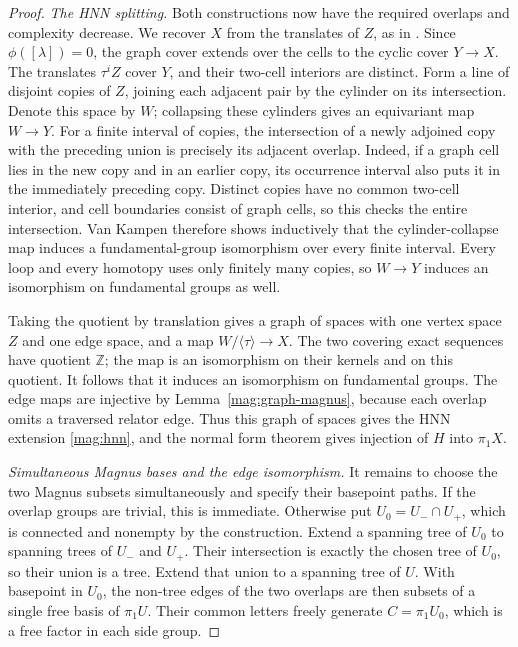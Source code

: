 \begin{proof}
\smallskip\noindent
\emph{The HNN splitting.}
Both constructions now have the required overlaps and complexity
decrease.  We recover $X$ from the translates of $Z$, as in
\cite[Proposition~4.3]{LintonHierarchies2025}.  Since
$\phi([\lambda])=0$, the graph cover extends over the cells to
the cyclic cover $Y\to X$.  The translates $\tau^iZ$ cover $Y$,
and their two-cell interiors are distinct.
Form a line of disjoint copies of $Z$, joining each adjacent pair
by the cylinder on its intersection.  Denote this space by $W$;
collapsing these cylinders gives an equivariant map $W\to Y$.
For a finite interval of copies, the intersection of a newly
adjoined copy with the preceding union is precisely its adjacent
overlap.  Indeed, if a graph cell lies in the new copy and in an
earlier copy, its occurrence interval also puts it in the
immediately preceding copy.  Distinct copies have no common
two-cell interior, and cell boundaries consist of graph cells,
so this checks the entire intersection.
Van Kampen therefore shows inductively that the
cylinder-collapse map induces a fundamental-group isomorphism
over every finite interval.  Every loop and every homotopy uses
only finitely many copies, so $W\to Y$ induces an isomorphism on
fundamental groups as well.

Taking the quotient by translation gives a graph of spaces with
one vertex space $Z$ and one edge space, and a map
$W/\langle\tau\rangle\to X$.
The two covering exact sequences have quotient $\mathbb Z$;
the map is an isomorphism on their kernels and on this quotient.
It follows that it induces an isomorphism on fundamental groups.
The edge maps are injective by
Lemma~\ref{mag:graph-magnus}, because each overlap omits a
traversed relator edge.  Thus this graph of spaces gives the HNN
extension \eqref{mag:hnn}, and the normal form theorem gives
injection of $H$ into $\pi_1X$.

\smallskip\noindent
\emph{Simultaneous Magnus bases and the edge isomorphism.}
It remains to choose the two Magnus subsets simultaneously and
specify their basepoint paths.  If the overlap groups are trivial, this is
immediate.  Otherwise put $U_0=U_-\cap U_+$, which is connected
and nonempty by the construction.  Extend a spanning tree of
$U_0$ to spanning trees of $U_-$ and $U_+$.
Their intersection is exactly the chosen tree of $U_0$, so their
union is a tree.  Extend that union to a spanning tree of $U$.
With basepoint in $U_0$, the non-tree edges of the two overlaps
are then subsets of a single free basis of $\pi_1U$.
Their common letters freely generate $C=\pi_1U_0$, which is a
free factor in each side group.


\end{proof}
